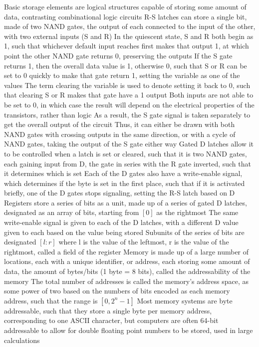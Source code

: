 \documentclass[11 pt, twoside]{article}
\newenvironment{outline*}
{
	\begin{outline}[enumerate]
	}
	{\end{outline}
}
\begin{document}
\begin{outline*}
\1 Basic storage elements are logical structures capable of storing some amount of data, contrasting combinational logic circuits
\2 R-S latches can store a single bit, made of two NAND gates, the output of each connected to the input of the other, with two external inputs (S and R)
\3 In the quiescent state, S and R both begin as 1, such that whichever default input reaches first makes that output 1, at which point the other NAND gate returns 0, preserving the outputs
\3 If the S gate returns 1, then the overall data value is 1, otherwise 0, such that S or R can be set to 0 quickly to make that gate return 1, setting the variable as one of the values
\3 The term clearing the variable is used to denote setting it back to 0, such that clearing S or R makes that gate have a 1 output
\3 Both inputs are not able to be set to 0, in which case the result will depend on the electrical properties of the transistors, rather than logic
\3 As a result, the S gate signal is taken separately to get the overall output of the circuit
\3 Thus, it can either be drawn with both NAND gates with crossing outputs in the same direction, or with a cycle of NAND gates, taking the output of the S gate either way
\2 Gated D latches allow it to be controlled when a latch is set or cleared, such that it is two NAND gates, each gaining input from D, the gate in series with the R gate inverted, such that it determines which is set
\3 Each of the D gates also have a write-enable signal, which determines if the byte is set in the first place, such that if it is activated briefly, one of the D gates stops signaling, setting the R-S latch based on D
\2 Registers store a series of bits as a unit, made up of a series of gated D latches, designated as an array of bits, starting from $[0]$ as the rightmost
\3 The same write-enable signal is given to each of the D latches, with a different D value given to each based on the value being stored
\3 Subunits of the series of bits are designated $[l:r]$ where l is the value of the leftmost, r is the value of the rightmost, called a field of the register
\1 Memory is made up of a large number of locations, each with a unique identifier, or address, each storing some amount of data, the amount of bytes/bits (1 byte = 8 bits), called the addressability of the memory
\2 The total number of addresses is called the memory's address space, as some power of two based on the numbers of bits encoded as each memory address, such that the range is $[0, 2^{n} - 1]$
\2 Most memory systems are byte addressable, such that they store a single byte per memory address, corresponding to one ASCII character, but computers are often 64-bit addressable to allow for double floating point numbers to be stored, used in large calculations

\end{outline*}
\end{document}
